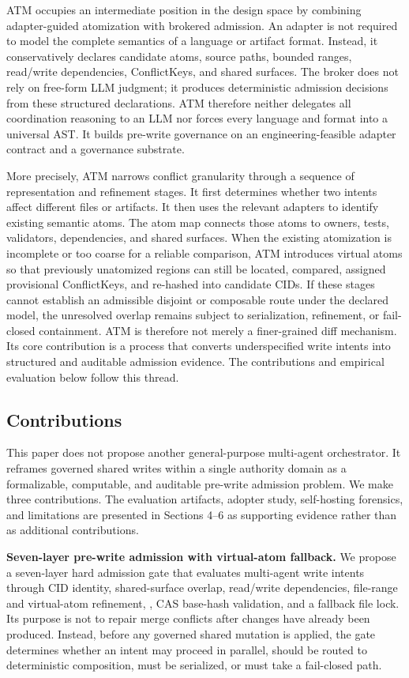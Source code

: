 \documentclass[9pt,letterpaper]{extarticle}
\begin{document}
ATM occupies an intermediate position in the design space by combining adapter-guided atomization with brokered admission. An adapter is not required to model the complete semantics of a language or artifact format. Instead, it conservatively declares candidate atoms, source paths, bounded ranges, read/write dependencies, ConflictKeys, and shared surfaces. The broker does not rely on free-form LLM judgment; it produces deterministic admission decisions from these structured declarations. ATM therefore neither delegates all coordination reasoning to an LLM nor forces every language and format into a universal AST. It builds pre-write governance on an engineering-feasible adapter contract and a governance substrate.

More precisely, ATM narrows conflict granularity through a sequence of representation and refinement stages. It first determines whether two intents affect different files or artifacts. It then uses the relevant adapters to identify existing semantic atoms. The atom map connects those atoms to owners, tests, validators, dependencies, and shared surfaces. When the existing atomization is incomplete or too coarse for a reliable comparison, ATM introduces virtual atoms so that previously unatomized regions can still be located, compared, assigned provisional ConflictKeys, and re-hashed into candidate CIDs. If these stages cannot establish an admissible disjoint or composable route under the declared model, the unresolved overlap remains subject to serialization, refinement, or fail-closed containment. ATM is therefore not merely a finer-grained diff mechanism. Its core contribution is a process that converts underspecified write intents into structured and auditable admission evidence. The contributions and empirical evaluation below follow this thread.

\subsection{Contributions}

This paper does not propose another general-purpose multi-agent orchestrator. It reframes governed shared writes within a single authority domain as a formalizable, computable, and auditable pre-write admission problem. We make three contributions. The evaluation artifacts, adopter study, self-hosting forensics, and limitations are presented in Sections 4--6 as supporting evidence rather than as additional contributions.

\textbf{Seven-layer pre-write admission with virtual-atom fallback.} We propose a seven-layer hard admission gate that evaluates multi-agent write intents through CID identity, shared-surface overlap, read/write dependencies, file-range and virtual-atom refinement, \texttt{}, CAS base-hash validation, and a fallback file lock. Its purpose is not to repair merge conflicts after changes have already been produced. Instead, before any governed shared mutation is applied, the gate determines whether an intent may proceed in parallel, should be routed to deterministic composition, must be serialized, or must take a fail-closed path.
\end{document}
